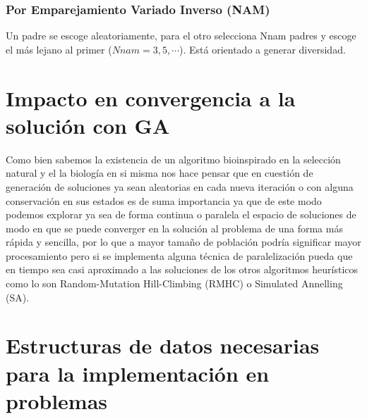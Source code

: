 \documentclass[10pt]{article}
\begin{document}
\subsubsection{Por Emparejamiento Variado Inverso (NAM)}
Un padre se escoge aleatoriamente, para el otro selecciona Nnam padres y escoge el más lejano al primer (\(\displaystyle Nnam=3,5,\cdots\)). Está orientado a generar diversidad.
\section{Impacto en convergencia a la solución con GA}
Como bien sabemos la existencia de un algoritmo bioinspirado en la selección natural y el la biología en si misma nos hace pensar que en cuestión de generación de soluciones ya sean aleatorias en cada nueva iteración o con alguna conservación en sus estados es de suma importancia ya que de este modo podemos explorar ya sea de forma continua o paralela el espacio de soluciones de modo en que se puede converger en la solución al problema de una forma más rápida y sencilla, por lo que a mayor tamaño de población podría significar mayor procesamiento pero si se implementa alguna técnica de paralelización pueda que en tiempo sea casi aproximado a las soluciones de los otros algoritmos heurísticos como lo son Random-Mutation Hill-Climbing (RMHC) o Simulated Annelling (SA).


\section{Estructuras de datos necesarias para la implementación en problemas}
\end{document}
